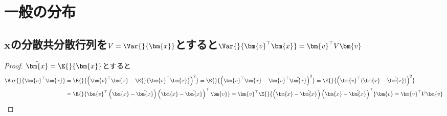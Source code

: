 \chapter{一般の分布}
    \section{\texorpdfstring{$\bm{x}$}{x}の分散共分散行列を\texorpdfstring{$V=\Var{}{\bm{x}}$}{V=Var(x)}とすると\texorpdfstring{$\Var{}{\bm{v}^\top\bm{x}} = \bm{v}^\top V\bm{v}$}{Var(v\string^T x) = v\string^T V v}}
        \begin{proof}
        \quad\par
            $\hat{\bm{x}} = \E{}{\bm{x}}$とすると
            \begin{align*}
                \Var{}{\bm{v}^\top\bm{x}} &= \E{}{\left(\bm{v}^\top\bm{x}-\E{}{\bm{v}^\top\bm{x}}\right)^2} = \E{}{\left(\bm{v}^\top\bm{x}-\bm{v}^\top\hat{\bm{x}}\right)^2} = \E{}{\left(\bm{v}^\top(\bm{x}-\hat{\bm{x}})\right)^2}\\
                &= \E{}{\bm{v}^\top\left(\bm{x}-\hat{\bm{x}}\right)\left(\bm{x}-\hat{\bm{x}}\right)^\top\bm{v}} = \bm{v}^\top\E{}{\left(\bm{x}-\hat{\bm{x}}\right)\left(\bm{x}-\hat{\bm{x}}\right)^\top}\bm{v} = \bm{v}^\top V\bm{v}
            \end{align*}
        \end{proof}
